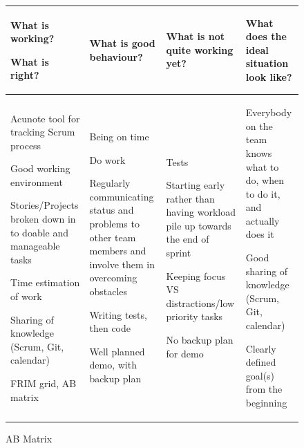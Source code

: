 \documentclass[a4paper,11pt]{article}
\begin{document}
\begin{figure}
	\centering
	\begin{tabular}{|p{3cm}|p{3cm}|p{3cm}|p{3cm}|}
	\hline
	What is working? \par What is right? & What is good behaviour? & What is not quite working yet? & What does the ideal situation look like? \tabularnewline\hline

	Acunote tool for tracking Scrum process
	\par\vspace{.5cm}
	Good working environment
	\par\vspace{.5cm}
	Stories/Projects broken down in to doable and manageable tasks
	\par\vspace{.5cm}
	Time estimation of work
	\par\vspace{.5cm}
	Sharing of knowledge
	(Scrum, Git, calendar)
	\par\vspace{.5cm}
	FRIM grid, AB matrix

	& 

	Being on time
	\par\vspace{.5cm}
	Do work
	\par\vspace{.5cm}
	Regularly communicating status and problems to other team members and involve them in overcoming obstacles
	\par\vspace{.5cm}
	Writing tests, then code
	\par\vspace{.5cm}
	Well planned demo, with backup plan
	
	& 
	
	Tests
	\par\vspace{.5cm}
	Starting early rather than having workload pile up towards the end of sprint
	\par\vspace{.5cm}
	Keeping focus VS distractions/low priority tasks
	\par\vspace{.5cm}
	No backup plan for demo
	
	& 
	
	Everybody on the team knows what to do, when to do it, and actually does it
	\par\vspace{.5cm}
	Good sharing of knowledge
	(Scrum, Git, calendar)
	\par\vspace{.5cm}
	Clearly defined goal(s) from the beginning
	\tabularnewline\hline
	\end{tabular}	
	\caption{AB Matrix}
	\label{abmatrix}
\end{figure}
\end{document}
